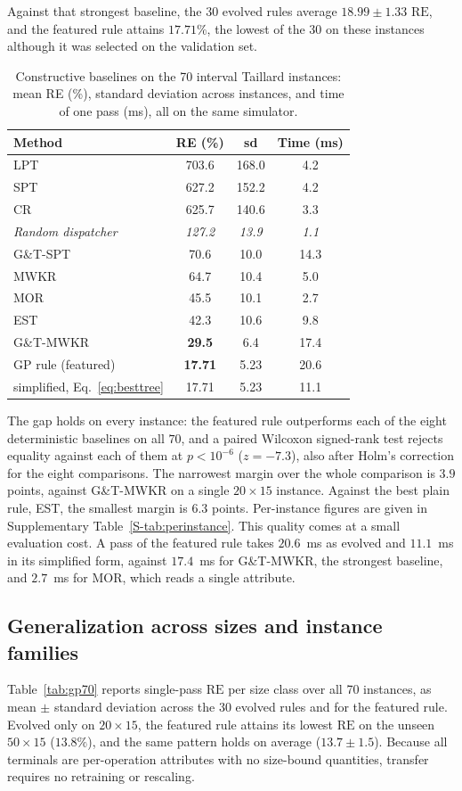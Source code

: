 \documentclass[review,authoryear,11pt]{elsarticle}
\newcommand{\RE}{\mathrm{RE}}
\begin{document}
Against that strongest baseline, the 30 evolved rules average
$18.99 \pm 1.33$ $\RE$, and the featured rule attains $17.71\%$, the
lowest of the 30 on these instances although it was selected on the
validation set.

\begin{table}[t]
\centering\small
\caption{Constructive baselines on the 70 interval Taillard instances: mean RE
(\%), standard deviation across instances, and time of one pass (ms), all
on the same simulator.}
\label{tab:baselines}
\begin{tabular}{lccc}
\toprule
Method & RE (\%) & sd & Time (ms) \\
\midrule
LPT & 703.6 & 168.0 & 4.2 \\
SPT & 627.2 & 152.2 & 4.2 \\
CR & 625.7 & 140.6 & 3.3 \\
\midrule
\textit{Random dispatcher} & \textit{127.2} & \textit{13.9} & \textit{1.1} \\
\midrule
G\&T-SPT & 70.6 & 10.0 & 14.3 \\
MWKR & 64.7 & 10.4 & 5.0 \\
MOR & 45.5 & 10.1 & 2.7 \\
EST & 42.3 & 10.6 & 9.8 \\
G\&T-MWKR & \textbf{29.5} & 6.4 & 17.4 \\
\midrule
GP rule (featured) & \textbf{17.71} & 5.23 & 20.6 \\
\quad simplified, Eq.~\eqref{eq:besttree} & 17.71 & 5.23 & 11.1 \\
\bottomrule
\end{tabular}
\end{table}
The gap holds on every instance: the featured rule outperforms each of
the eight deterministic baselines on all $70$, and a paired Wilcoxon
signed-rank test rejects equality against each of them at $p<10^{-6}$
($z=-7.3$), also after Holm's correction for the eight comparisons. The
narrowest margin over the whole comparison is $3.9$ points, against
G\&T-MWKR on a single $20{\times}15$ instance. Against the best plain
rule, EST, the smallest margin is $6.3$ points. Per-instance figures are given in
Supplementary Table~\ref{S-tab:perinstance}. This quality comes at
a small evaluation cost. A pass of the featured rule takes
$20.6$~ms as evolved and $11.1$~ms in its simplified form,
against $17.4$~ms for G\&T-MWKR, the strongest baseline, and
$2.7$~ms for MOR, which reads a single attribute.

\subsection{Generalization across sizes and instance families}
\label{sec:generalization}
\label{sec:classics}
Table~\ref{tab:gp70} reports single-pass $\RE$ per size class over all
70 instances, as mean $\pm$ standard deviation across the 30 evolved
rules and for the featured rule. Evolved only on $20{\times}15$,
the featured rule attains its lowest $\RE$ on the
unseen $50{\times}15$ ($13.8\%$), and the same pattern holds on
average ($13.7 \pm 1.5$). Because all terminals are per-operation
attributes with no size-bound quantities, transfer requires no
retraining or rescaling.
\end{document}
